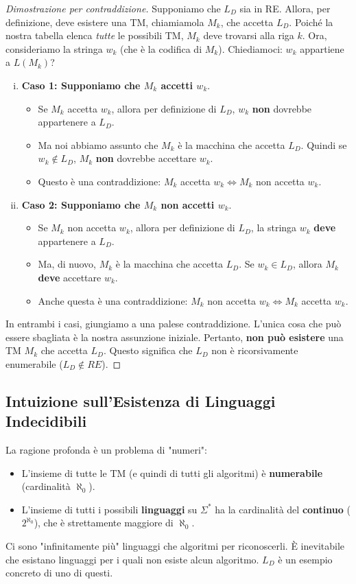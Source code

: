 \documentclass[a4paper]{article}
\theoremstyle{definition} %
\theoremstyle{remark} %
\begin{document}
\begin{proof}[Dimostrazione per contraddizione]
Supponiamo che $L_D$ sia in RE. Allora, per definizione, deve esistere una TM, chiamiamola $M_k$, che accetta $L_D$. Poiché la nostra tabella elenca \textit{tutte} le possibili TM, $M_k$ deve trovarsi alla riga $k$.
Ora, consideriamo la stringa $w_k$ (che è la codifica di $M_k$). Chiediamoci: $w_k$ appartiene a $L(M_k)$?

\begin{enumerate}[(i)]
    \item \textbf{Caso 1: Supponiamo che $M_k$ accetti $w_k$}.
    \begin{itemize}
        \item Se $M_k$ accetta $w_k$, allora per definizione di $L_D$, $w_k$ \textbf{non} dovrebbe appartenere a $L_D$.
        \item Ma noi abbiamo assunto che $M_k$ è la macchina che accetta $L_D$. Quindi se $w_k \notin L_D$, $M_k$ \textbf{non} dovrebbe accettare $w_k$.
        \item Questo è una contraddizione: $M_k$ accetta $w_k \iff M_k$ non accetta $w_k$.
    \end{itemize}

    \item \textbf{Caso 2: Supponiamo che $M_k$ non accetti $w_k$}.
    \begin{itemize}
        \item Se $M_k$ non accetta $w_k$, allora per definizione di $L_D$, la stringa $w_k$ \textbf{deve} appartenere a $L_D$.
        \item Ma, di nuovo, $M_k$ è la macchina che accetta $L_D$. Se $w_k \in L_D$, allora $M_k$ \textbf{deve} accettare $w_k$.
        \item Anche questa è una contraddizione: $M_k$ non accetta $w_k \iff M_k$ accetta $w_k$.
    \end{itemize}
\end{enumerate}
In entrambi i casi, giungiamo a una palese contraddizione. L'unica cosa che può essere sbagliata è la nostra assunzione iniziale. Pertanto, \textbf{non può esistere} una TM $M_k$ che accetta $L_D$. Questo significa che $L_D$ non è ricorsivamente enumerabile ($L_D \notin RE$).
\end{proof}

\subsection{Intuizione sull'Esistenza di Linguaggi Indecidibili}
La ragione profonda è un problema di "numeri":
\begin{itemize}
    \item L'insieme di tutte le TM (e quindi di tutti gli algoritmi) è \textbf{numerabile} (cardinalità $\aleph_0$).
    \item L'insieme di tutti i possibili \textbf{linguaggi} su $\Sigma^*$ ha la cardinalità del \textbf{continuo} ($2^{\aleph_0}$), che è strettamente maggiore di $\aleph_0$.
\end{itemize}
Ci sono "infinitamente più" linguaggi che algoritmi per riconoscerli. È inevitabile che esistano linguaggi per i quali non esiste alcun algoritmo. $L_D$ è un esempio concreto di uno di questi.
\end{document}
